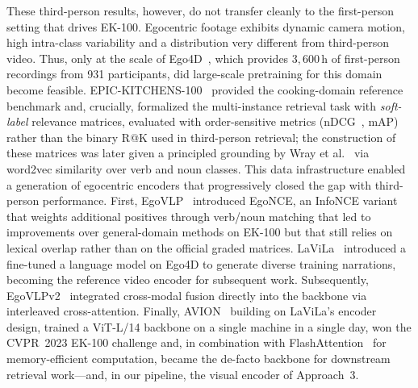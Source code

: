 These third-person results, however, do not transfer cleanly to the first-person setting that drives EK-100. Egocentric footage exhibits dynamic camera motion, high intra-class variability and a distribution very different from third-person video. Thus, only at the scale of Ego4D~\cite{grauman2022ego4d}, which provides $3{,}600$\,h of first-person recordings from 931 participants, did large-scale pretraining for this domain become feasible. EPIC-KITCHENS-100~\cite{damen2022rescaling} provided the cooking-domain reference benchmark and, crucially, formalized the multi-instance retrieval task with \emph{soft-label} relevance matrices, evaluated with order-sensitive metrics (nDCG~\cite{jarvelin2002ndcg}, mAP) rather than the binary R@K used in third-person retrieval; the construction of these matrices was later given a principled grounding by Wray et al.~\cite{wray2021semantic} via word2vec similarity over verb and noun classes. This data infrastructure enabled a generation of egocentric encoders that progressively closed the gap with third-person performance. First, EgoVLP~\cite{lin2022egovlp} introduced EgoNCE, an InfoNCE variant that weights additional positives through verb/noun matching that led to improvements over general-domain methods on EK-100 but that still relies on lexical overlap rather than on the official graded matrices. LaViLa~\cite{zhao2023lavila} introduced a  fine-tuned a language model on Ego4D to generate diverse training narrations, becoming the reference video encoder for subsequent work. Subsequently, EgoVLPv2~\cite{pramanick2023egovlpv2} integrated cross-modal fusion directly into the backbone via interleaved cross-attention. Finally, AVION~\cite{zhao2023avion} building on LaViLa's encoder design, trained a ViT-L/14 backbone on a single machine in a single day, won the CVPR~2023 EK-100 challenge and, in combination with FlashAttention~\cite{dao2022flashattention} for memory-efficient computation, became the de-facto backbone for downstream retrieval work---and, in our pipeline, the visual encoder of Approach~3.

